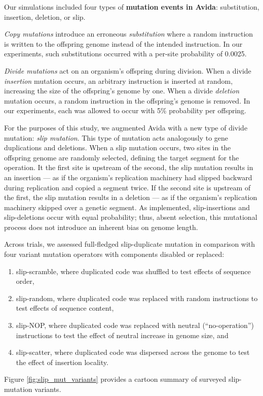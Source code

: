 

Our simulations included four types of \textbf{mutation events in Avida}: substitution, insertion, deletion, or slip.

\textit{Copy mutations} introduce an erroneous \textit{substitution} where a random instruction is written to the offspring genome instead of the intended instruction.
In our experiments, such substitutions occurred with a per-site probability of 0.0025.

\textit{Divide mutations} act on an organism's offspring during division.
When a divide \textit{insertion} mutation occurs, an arbitrary instruction is inserted at random, increasing the size of the offspring's genome by one.
When a divide \textit{deletion} mutation occurs, a random instruction in the offspring's genome is removed.
In our experiments, each was allowed to occur with 5\% probability per offspring.

For the purposes of this study, we augmented Avida with a new type of divide mutation: \textit{slip mutation}.
This type of mutation acts analogously to gene duplications and deletions.
When a slip mutation occurs, two sites in the offspring genome are randomly selected, defining the target segment for the operation.
It the first site is upstream of the second, the slip mutation results in an insertion --- as if the organism's replication machinery had slipped backward during replication and copied a segment twice.
If the second site is upstream of the first, the slip mutation results in a deletion --- as if the organism's replication machinery skipped over a genetic segment.
As implemented, slip-insertions and slip-deletions occur with equal probability; thus, absent selection, this mutational process does not introduce an inherent bias on genome length.

Across trials, we assessed full-fledged slip-duplicate mutation in comparison with four variant mutation operators with components disabled or replaced:
\begin{enumerate}
\item slip-scramble, where duplicated code was shuffled to test effects of sequence order,
\item slip-random, where duplicated code was replaced with random instructions to test effects of sequence content,
\item slip-NOP, where duplicated code was replaced with neutral (``no-operation'') instructions to test the effect of neutral increase in genome size, and
\item slip-scatter, where duplicated code was dispersed across the genome to test the effect of insertion locality.
\end{enumerate}
Figure \ref{fig:slip_mut_variants} provides a cartoon summary of surveyed slip-mutation variants.

